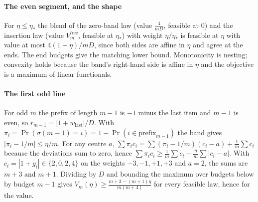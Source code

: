 
\paragraph{The even segment, and the shape} For $\eta\le\eta_{*}$ the blend of the zero-band
law (value $\frac{4}{mD}$, feasible at $0$) and the insertion law (value $V^{\mathrm{free}}_{m}$,
feasible at $\eta_{*}$) with weight $\eta/\eta_{*}$ is feasible at $\eta$ with value at most
$4(1-\eta)/mD$, since both sides are affine in $\eta$ and agree at the ends. The end budgets
give the matching lower bound. Monotonicity is nesting; convexity holds because the band's
right-hand side is affine in $\eta$ and the objective is a maximum of linear functionals.


\paragraph{The first odd line} For odd $m$ the prefix of
length $m-1$ is $-1$ minus the last item and $m-1$ is even, so
$r_{m-1}=|1+w_{\mathrm{last}}|/D$. With $\pi_{i}=\Pr(\sigma(m-1)=i)=1-\Pr(i\in
\mathrm{prefix}_{m-1})$ the band gives $|\pi_{i}-1/m|\le\eta/m$. For any centre $a$,
$\sum\pi_{i}c_{i}=\sum(\pi_{i}-1/m)(c_{i}-a)+\frac1m\sum c_{i}$ because the deviations sum
to zero, hence $\sum\pi_{i}c_{i}\ge\frac1m\sum c_{i}-\frac\eta m\sum|c_{i}-a|$. With
$c_{i}=|1+g_{i}|\in\{2,0,2,4\}$ on the weights $-3,-1,+1,+3$ and $a=2$, the sums are $m+3$
and $m+1$. Dividing by $D$ and bounding the maximum over budgets below by budget $m-1$ gives
$V_{m}(\eta)\ge\frac{m+3-(m+1)\eta}{m(m+4)}$ for every feasible law, hence for the value.


